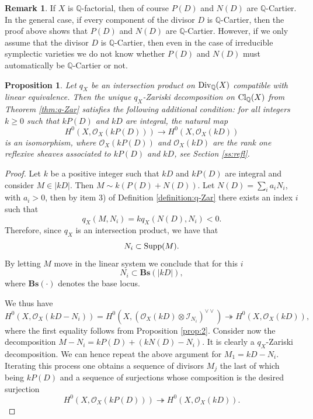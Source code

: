 \documentclass[12pt,reqno]{amsart}
\def\Q{{\mathbb Q}}
\def\Cl{\mathop{\rm Cl}\nolimits}
\def\Div{\mathop{\rm Div}\nolimits}
\def\supp{\mathop{\rm Supp}\nolimits}
\newtheorem{prop}[thm]{Proposition}
\theoremstyle{plain}
\theoremstyle{definition}
\newtheorem{remark}[thm]{Remark}
\begin{document}
 
\begin{remark}
If $X$ is $\Q$-factorial, then of course $P(D)$ and $N(D)$ are $\Q$-Cartier. In the general case, if every component of the divisor $D$ is $\Q$-Cartier, then the proof above shows that $P(D)$ and $N(D)$ are $\Q$-Cartier. However, if we only assume that the divisor $D$ is $\Q$-Cartier, then even in the case of irreducible symplectic varieties we do not know whether $P(D)$ and $N(D)$ must automatically be $\Q$-Cartier or not.
\end{remark} 

 \begin{prop} Let $q_X$ be an intersection product on $\Div_{\Q}(X)$ compatible with linear equivalence. Then the unique $q_X$-Zariski decomposition on $\Cl_{\Q}(X)$ from Theorem \ref{thm:q-Zar} satisfies the following additional condition: for all integers $k\geq 0$ such that $kP(D)$ and $kD$ are integral, the natural map 
$$
 H^0(X,\mathcal O_X(kP(D)))\to H^0(X,\mathcal O_X (kD))
$$
is an isomorphism, where $\mathcal O_X(kP(D))$ and $\mathcal O_X(kD)$ are the 
rank one reflexive sheaves associated to $kP(D)$ and $kD$, see Section \ref{ss:refl}.
\end{prop}

\begin{proof}
Let $k$ be a positive integer such that $kD$ and $kP(D)$ are integral and consider $M \in |kD|$. 
Then $M\sim k (P(D) + N(D))$. Let $N(D)=\sum_i a_i N_i$, with $a_i>0$, then by item 3) of Definition \ref{definition:q-Zar} there exists an index $i$ such that 
$$
q_X (M, N_i)= kq_X (N(D), N_i)<0.
$$
Therefore, since $q_X$ is an intersection product, we have that
\begin{equation}\label{eq:negative_support}
 N_i \subset \supp(M).
\end{equation}
By letting $M$ move in the linear system we conclude that for this $i$
$$
 N_i \subset \mathbf {Bs}(|kD|),
$$
where $\mathbf{Bs}(\cdot)$ denotes the  base locus. 

We thus have 
$$
 H^0(X,\mathcal O_X(kD-N_i))=H^0(X,(\mathcal O_X(kD)\otimes \mathcal I_{N_i})^{\vee \vee})\twoheadrightarrow H^0(X,\mathcal O_X(kD)),
$$
where the first equality follows from Proposition \ref{prop:2}.
Consider now  the decomposition $M-N_i= kP(D)+ (kN(D)-N_i)$. It is clearly a $q_{X}$-Zariski decomposition. We can hence repeat the above argument for $M_1=kD-N_i$. Iterating this process one obtains a sequence of divisors $M_j$ the last of which being $kP(D)$ and a sequence of surjections whose composition is the desired surjection
$$
 H^0(X,\mathcal O_X(kP(D)))\twoheadrightarrow H^0(X,\mathcal O_X(kD)).
$$

\end{proof}
\end{document}
